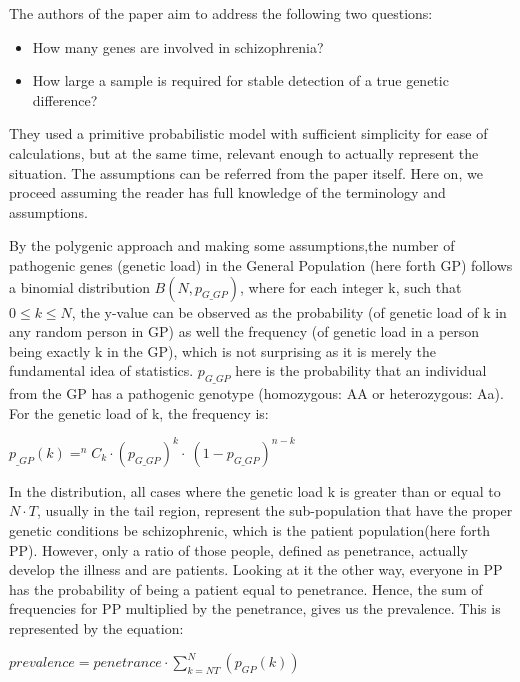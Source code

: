 \documentclass{article}
\begin{document}
The authors of the paper aim to address the following two questions:
\begin{itemize}
    \item How many genes are involved in schizophrenia?
    \item How large a sample is required for stable detection of a true genetic difference?
\end{itemize}

They used a primitive probabilistic model with sufficient simplicity for ease of calculations, but at the same time, relevant enough to actually represent the situation. The assumptions can be referred from the paper itself. Here on, we proceed assuming the reader has full knowledge of the terminology and assumptions.

By the polygenic approach and making some assumptions,the number of pathogenic genes (genetic load) in the General Population (here forth GP) follows a binomial distribution $B(N, p_{G\_GP})$, where for each integer k, such that $0\leq k\leq N$, the y-value can be observed as the probability (of genetic load of k in any random person in GP) as well the frequency (of genetic load in a person being exactly k in the GP), which is not surprising as it is merely the fundamental idea of statistics. $p_{G\_GP}$ here is the probability that an individual from the GP has a pathogenic genotype (homozygous: AA or heterozygous: Aa). For the genetic load of k, the frequency is:

\begin{center}
$p_{\_GP}(k) = ^nC_{k} \cdot (p_{G\_GP})^k \cdot\ ( 1-p_{G\_GP})^{n-k}$
\end{center}

In the distribution, all cases where the genetic load k is greater than or equal to $N\cdot T$, usually in the tail region, represent the sub-population that have the proper genetic conditions be schizophrenic, which is the patient population(here forth PP). However, only a ratio of those people, defined as penetrance, actually develop the illness and are patients. Looking at it the other way, everyone in PP has the probability of being a patient equal to penetrance. Hence, the sum of frequencies for PP multiplied by the penetrance, gives us the prevalence. This is represented by the equation:
  
\begin{center}
$prevalence = penetrance \cdot \sum_{k=NT}^{N} (p_{GP}(k))$
\end{center}
  
\end{document}
